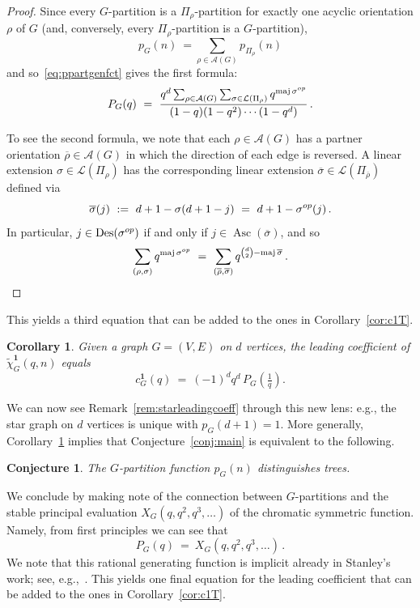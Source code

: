 \documentclass[11pt]{amsart}
\newtheorem{corollary}[theorem]{Corollary}
\newtheorem{conjecture}{Conjecture}
\newcommand\Des{\operatorname{Des}}
\newcommand\Asc{\operatorname{Asc}}
\newcommand\maj{\operatorname{maj}}
\newcommand\bone{\mathbf{1}}
\newcommand\op{^{\rm op}}
\begin{document}
\begin{proof}
Since every $G$-partition is a $\Pi_\rho$-partition for exactly one acyclic
orientation $\rho$ of $G$ (and, conversely, every $\Pi_\rho$-partition is a
$G$-partition),
\[
  p_G(n) \ = \sum_{\rho\in \mathcal{A}(G)} p_{ \Pi_\rho } (n)
\]
and so~\eqref{eq:ppartgenfct} gives the first formula:
\[
  P_G(q)
  \ = \ \frac{ q^d \sum_{\rho\in \mathcal{A}(G)} \sum_{ \sigma \in \mathcal{L}(\Pi_\rho) } q^{ \maj \sigma\op } }{ (1-q) (1-q^2) \cdots (1-q^d) } \, .
\]

To see the second formula, we note that each $\rho\in \mathcal{A}(G)$ has a partner
orientation $\overline\rho \in \mathcal{A}(G)$ in which the direction of each edge is
reversed. A linear extension $\sigma \in \mathcal{L}(\Pi_\rho)$ has the corresponding
linear extension $\overline\sigma \in \mathcal{L}(\Pi_{\overline\rho})$ defined via
\[
  \overline\sigma(j)
  \ := \ d+1 - \sigma(d+1-j)
  \  = \ d+1 - \sigma\op(j) \, .
\]
In particular, $j \in \Des(\sigma\op)$ if and only if $j \in \Asc(\overline\sigma)$, and so
\[
  \sum_{(\rho,\sigma)} q^{ \maj \sigma\op }
  \ = \ \sum_{(\overline\rho,\overline\sigma)} q^{ \binom d 2 - \maj \overline\sigma } \, .
\qedhere
\]
\end{proof}

This yields a third equation that can be added to the ones in Corollary~\ref{cor:c1T}.

\begin{corollary}\label{cor:leadingcoeffgpartition}
Given a graph $G=(V,E)$ on $d$ vertices, the leading coefficient of $\widetilde\chi^\bone_G(q,n)$ equals
\[
  c^{ \bone }_G (q) \ = \ (-1)^d q^d \, P_G \left( \tfrac 1 q \right) .
\]
\end{corollary}

We can now see Remark~\ref{rem:starleadingcoeff} through this new lens:
e.g., the star graph on $d$ vertices is unique with $p_G(d+1) = 1$.
More generally, Corollary~\ref{cor:leadingcoeffgpartition} implies that Conjecture~\ref{conj:main} is equivalent to the following.

\begin{conjecture}
The $G$-partition function $p_G(n)$ distinguishes trees.
\end{conjecture}

We conclude by making note of the connection between $G$-partitions and the stable principal evaluation $X_G(q,q^2,q^3,\hdots)$ of the chromatic symmetric function.
Namely, from first principles we can see that
\[
P_G(q) \ = \ X_G(q,q^2,q^3,\hdots) \, .
\]
We note that this rational generating function is implicit already in Stanley's work; see,
e.g.,~\cite[end of Section~1]{stanleyacyclic}.
This yields one final equation for the leading coefficient that can be added to the ones in Corollary~\ref{cor:c1T}.
\end{document}
